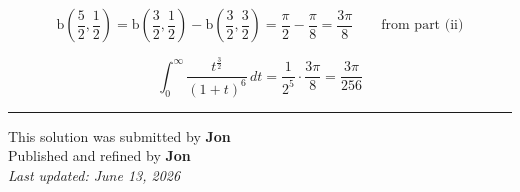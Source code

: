 \documentclass[12pt]{article}
\begin{document}
$$\mathrm{b}\left(\frac52,\frac12\right)
=\mathrm{b}\left(\frac32,\frac12\right)
-\mathrm{b}\left(\frac32,\frac32\right)
=\frac{\pi}{2}-\frac{\pi}{8}
=\frac{3\pi}{8}
\qquad \text{from part (ii)}$$

$$\int_0^\infty\frac{t^{\frac32}}{(1+t)^6}\,dt=\frac{1}{2^5}\cdot\frac{3\pi}{8}=\boxed{\frac{3\pi}{256}}$$



\bigskip
\hrule
\begin{center}
    This solution was submitted by \textbf{Jon}\\[4pt]
    Published and refined by \textbf{Jon}\\[8pt]
    \textit{Last updated: June 13, 2026}
\end{center}
\end{document}
